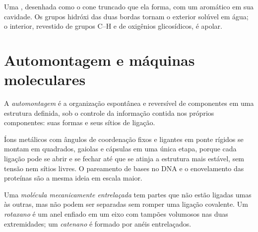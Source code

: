 \begin{omfigure}

{\small Uma , desenhada como o cone truncado que ela forma, com um 
aromático em sua cavidade. Os grupos hidróxi das duas bordas tornam o exterior
solúvel em água; o interior, revestido de grupos C--H e de oxigênios glicosídicos, é
apolar.}
\end{omfigure}

\section{Automontagem e máquinas moleculares}

\begin{definition}[Automontagem]\label{def:b3:supramolecular:self-assembly}
A \emph{automontagem} é a organização espontânea e reversível
de componentes em uma estrutura definida, sob o controle da
informação contida nos próprios componentes: suas formas e seus sítios de
ligação.
\end{definition}

Íons metálicos com ângulos de coordenação fixos e ligantes em ponte rígidos se montam
em quadrados, gaiolas e cápsulas em uma única etapa, porque cada ligação pode se abrir
e se fechar até que se atinja a estrutura mais estável, sem tensão nem sítios livres.
O pareamento de bases no DNA e o enovelamento das proteínas são a mesma ideia
em escala maior.

\begin{definition}\label{def:b3:supramolecular:interlocked}
Uma \emph{molécula mecanicamente entrelaçada}
tem partes que não estão ligadas umas às outras, mas não podem ser separadas
sem romper uma ligação covalente. Um \emph{rotaxano} é um anel
enfiado em um eixo com tampões volumosos nas duas extremidades; um
\emph{catenano} é formado por anéis entrelaçados.
\end{definition}

